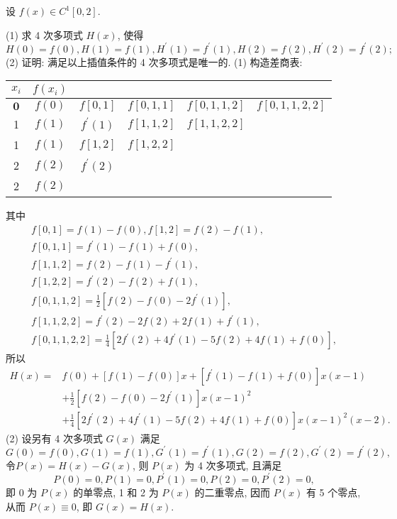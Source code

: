    \begin{tcolorbox}[enhanced,colback=10,colframe=9,breakable,coltitle=green!25!black,title=2024]
 设 $ f(x) \in C^{1}[0,2] $.
 
(1) 求 4 次多项式 $ H(x) $, 使得
$$
H(0)=f(0), H(1)=f(1), H^{\prime}(1)=f^{\prime}(1), H(2)=f(2), H^{\prime}(2)=f^{\prime}(2) \text {; }
$$
(2) 证明: 满足以上插值条件的 4 次多项式是唯一的.
\tcblower
 (1) 构造差商表:
 \begin{center}
\begin{tabular}{c|ccccc}
\hline$ x_{i} $ & $ f\left(x_{i}\right) $ & & & & \\
\hline $ \mathbf{0} $ & $ f(0) $ & $ f[0,1] $ & $ f[0,1,1] $ & $ f[0,1,1,2] $ & $ f[0,1,1,2,2] $ \\
1 & $ f(1) $ & $ f^{\prime}(1) $ & $ f[1,1,2] $ & $ f[1,1,2,2] $ & \\
1 & $ f(1) $ & $ f[1,2] $ & $ f[1,2,2] $ & & \\
2 & $ f(2) $ & $ f^{\prime}(2) $ & & & \\
2 & $ f(2) $ & & & & \\
\hline
\end{tabular}
 \end{center}
 其中
$$
\begin{array}{c}
f[0,1]=f(1)-f(0), f[1,2]=f(2)-f(1), \\
f[0,1,1]=f^{\prime}(1)-f(1)+f(0), \\
f[1,1,2]=f(2)-f(1)-f^{\prime}(1), \\
f[1,2,2]=f^{\prime}(2)-f(2)+f(1), \\
f[0,1,1,2]=\frac{1}{2}\left[f(2)-f(0)-2 f^{\prime}(1)\right], \\
f[1,1,2,2]=f^{\prime}(2)-2 f(2)+2 f(1)+f^{\prime}(1), \\
f[0,1,1,2,2]=\frac{1}{4}\left[2 f^{\prime}(2)+4 f^{\prime}(1)-5 f(2)+4 f(1)+f(0)\right],
\end{array}
$$
所以
$$
\begin{aligned}
H(x)= & f(0)+[f(1)-f(0)] x+\left[f^{\prime}(1)-f(1)+f(0)\right] x(x-1) \\
& +\frac{1}{2}\left[f(2)-f(0)-2 f^{\prime}(1)\right] x(x-1)^{2} \\
& +\frac{1}{4}\left[2 f^{\prime}(2)+4 f^{\prime}(1)-5 f(2)+4 f(1)+f(0)\right] x(x-1)^{2}(x-2) .
\end{aligned}
$$
(2) 设另有 4 次多项式 $ G(x) $ 满足
$$
G(0)=f(0), G(1)=f(1), G^{\prime}(1)=f^{\prime}(1), G(2)=f(2), G^{\prime}(2)=f^{\prime}(2) \text {, }
$$
令$P(x)=H(x)-G(x)$,
则 $ P(x) $ 为 4 次多项式, 且满足
$$
P(0)=0, P(1)=0, P^{\prime}(1)=0, P(2)=0, P^{\prime}(2)=0,
$$
即 0 为 $ P(x) $ 的单零点, 1 和 2 为 $ P(x) $ 的二重零点, 因而 $ P(x) $ 有 5 个零点, 从而 $ P(x) \equiv 0 $, 即 $ G(x)=H(x) $.
   \end{tcolorbox}

